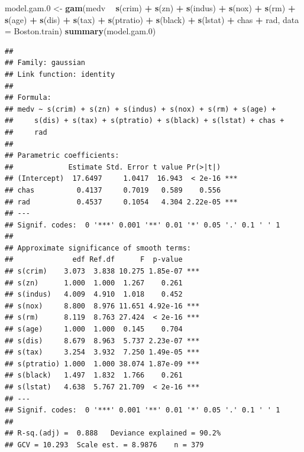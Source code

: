 \documentclass[UTF-8]{ctexart}
\newenvironment{Shaded}{\begin{snugshade}}{\end{snugshade}}
\newcommand{\DataTypeTok}[1]{\textcolor[rgb]{0.13,0.29,0.53}{#1}}
\newcommand{\FloatTok}[1]{\textcolor[rgb]{0.00,0.00,0.81}{#1}}
\newcommand{\KeywordTok}[1]{\textcolor[rgb]{0.13,0.29,0.53}{\textbf{#1}}}
\newcommand{\NormalTok}[1]{#1}
\newcommand{\OperatorTok}[1]{\textcolor[rgb]{0.81,0.36,0.00}{\textbf{#1}}}
\newcommand{\StringTok}[1]{\textcolor[rgb]{0.31,0.60,0.02}{#1}}
\begin{document}
\begin{Shaded}
	\begin{Highlighting}[]
\NormalTok{model.gam}\FloatTok{.0}\NormalTok{ <-}\StringTok{ }\KeywordTok{gam}\NormalTok{(medv }\OperatorTok{~}\StringTok{ }\KeywordTok{s}\NormalTok{(crim) }\OperatorTok{+}\StringTok{ }\KeywordTok{s}\NormalTok{(zn) }\OperatorTok{+}\StringTok{ }\KeywordTok{s}\NormalTok{(indus) }\OperatorTok{+}\StringTok{ }\KeywordTok{s}\NormalTok{(nox) }\OperatorTok{+}
\StringTok{                   }\KeywordTok{s}\NormalTok{(rm) }\OperatorTok{+}\StringTok{ }\KeywordTok{s}\NormalTok{(age) }\OperatorTok{+}\StringTok{ }\KeywordTok{s}\NormalTok{(dis) }\OperatorTok{+}\StringTok{ }
\StringTok{                   }\KeywordTok{s}\NormalTok{(tax) }\OperatorTok{+}\StringTok{ }\KeywordTok{s}\NormalTok{(ptratio) }\OperatorTok{+}\StringTok{ }\KeywordTok{s}\NormalTok{(black) }\OperatorTok{+}\StringTok{ }
\StringTok{                   }\KeywordTok{s}\NormalTok{(lstat) }\OperatorTok{+}\StringTok{ }\NormalTok{chas }\OperatorTok{+}\StringTok{ }\NormalTok{rad, }\DataTypeTok{data =}\NormalTok{ Boston.train)}
\KeywordTok{summary}\NormalTok{(model.gam}\FloatTok{.0}\NormalTok{)}
	\end{Highlighting}
\end{Shaded}

\begin{verbatim}
## 
## Family: gaussian 
## Link function: identity 
## 
## Formula:
## medv ~ s(crim) + s(zn) + s(indus) + s(nox) + s(rm) + s(age) + 
##     s(dis) + s(tax) + s(ptratio) + s(black) + s(lstat) + chas + 
##     rad
## 
## Parametric coefficients:
##             Estimate Std. Error t value Pr(>|t|)    
## (Intercept)  17.6497     1.0417  16.943  < 2e-16 ***
## chas          0.4137     0.7019   0.589    0.556    
## rad           0.4537     0.1054   4.304 2.22e-05 ***
## ---
## Signif. codes:  0 '***' 0.001 '**' 0.01 '*' 0.05 '.' 0.1 ' ' 1
## 
## Approximate significance of smooth terms:
##              edf Ref.df      F  p-value    
## s(crim)    3.073  3.838 10.275 1.85e-07 ***
## s(zn)      1.000  1.000  1.267    0.261    
## s(indus)   4.009  4.910  1.018    0.452    
## s(nox)     8.800  8.976 11.651 4.92e-16 ***
## s(rm)      8.119  8.763 27.424  < 2e-16 ***
## s(age)     1.000  1.000  0.145    0.704    
## s(dis)     8.679  8.963  5.737 2.23e-07 ***
## s(tax)     3.254  3.932  7.250 1.49e-05 ***
## s(ptratio) 1.000  1.000 38.074 1.87e-09 ***
## s(black)   1.497  1.832  1.766    0.261    
## s(lstat)   4.638  5.767 21.709  < 2e-16 ***
## ---
## Signif. codes:  0 '***' 0.001 '**' 0.01 '*' 0.05 '.' 0.1 ' ' 1
## 
## R-sq.(adj) =  0.888   Deviance explained = 90.2%
## GCV = 10.293  Scale est. = 8.9876    n = 379
\end{verbatim}
\end{document}
